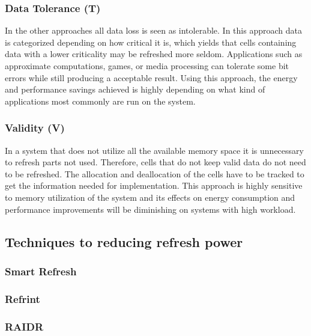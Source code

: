 \subsubsection*{\textbf{Data Tolerance (T)}}
In the other approaches all data loss is seen as intolerable. In this approach data is categorized depending on how critical it is, which yields that cells containing data with a lower criticality may be refreshed more seldom. Applications such as approximate computations, games, or media processing can tolerate some bit errors while still producing a acceptable result. Using this approach, the energy and performance savings achieved is highly depending on what kind of applications most commonly are run on the system. 

\subsubsection*{\textbf{Validity (V)}}
In a system that does not utilize all the available memory space it is unnecessary to refresh parts not used. Therefore, cells that do not keep valid data do not need to be refreshed. The allocation and deallocation of the cells have to be tracked to get the information needed for implementation. This approach is highly sensitive to memory utilization of the system and its effects on energy consumption and performance improvements will be diminishing on systems with high workload.  

\subsection{Techniques to reducing refresh power}
\label{sec:red:tech}

\subsubsection*{\textbf{Smart Refresh}}
\label{par:smartrefresh}


\subsubsection*{\textbf{Refrint}}
\label{par:refrint}


\subsubsection*{\textbf{RAIDR}}
\label{par:raidr}


